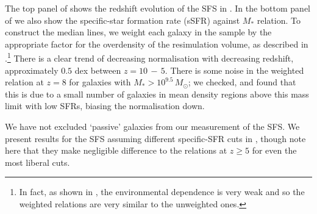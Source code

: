 The top panel of  shows the redshift evolution of the SFS in \flares.
In the bottom panel of  we also show the specific-star formation rate (sSFR) against $M_{*}$ relation.
To construct the median lines, we weight each galaxy in the sample by the appropriate factor for the overdensity of the resimulation volume, as described in .\footnote{In fact, as shown in , the environmental dependence is very weak and so the weighted relations are very similar to the unweighted ones.}
There is a clear trend of decreasing normalisation with decreasing redshift, approximately $0.5$ dex between $z = 10 \,-\, 5$.
There is some noise in the weighted relation at $z = 8$ for galaxies with $M_{*} > 10^{9.5} \, M_{\odot}$; we checked, and found that this is due to a small number of galaxies in mean density regions above this mass limit with low SFRs, biasing the normalisation down.

We have not excluded `passive' galaxies from our measurement of the SFS.
We present results for the SFS assuming different specific-SFR cuts in , though note here that they make negligible difference to the relations at $z \geqslant 5$ for even the most liberal cuts.


